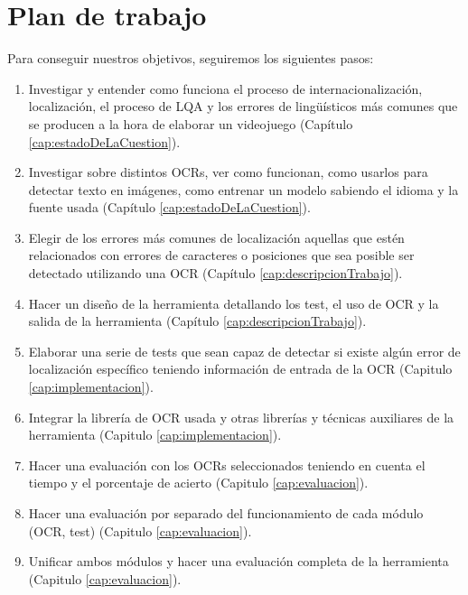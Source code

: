 \section{Plan de trabajo}
Para conseguir nuestros objetivos, seguiremos los siguientes pasos:
\begin{enumerate}
	\item Investigar y entender como funciona el proceso de internacionalización, localización, el proceso de LQA y los errores de lingüísticos más comunes que se producen a la hora de elaborar un videojuego (Capítulo \ref{cap:estadoDeLaCuestion}).
	\item Investigar sobre distintos OCRs, ver como funcionan, como usarlos para detectar texto en imágenes, como entrenar un modelo sabiendo el idioma y la fuente usada (Capítulo \ref{cap:estadoDeLaCuestion}).
	\item Elegir de los errores más comunes de localización aquellas que estén relacionados con errores de caracteres o posiciones que sea posible ser detectado utilizando una OCR (Capítulo \ref{cap:descripcionTrabajo}).
	\item Hacer un diseño de la herramienta detallando los test, el uso de OCR y la salida de la herramienta (Capítulo \ref{cap:descripcionTrabajo}).
	\item Elaborar una serie de tests que sean capaz de detectar si existe algún error de localización específico teniendo información de entrada de la OCR (Capitulo \ref{cap:implementacion}).
	\item Integrar la librería de OCR usada y otras librerías y técnicas auxiliares de la herramienta (Capitulo \ref{cap:implementacion}).
	\item Hacer una evaluación con los OCRs seleccionados teniendo en cuenta el tiempo y el porcentaje de acierto (Capitulo \ref{cap:evaluacion}).
	\item Hacer una evaluación por separado del funcionamiento de cada módulo (OCR, test) (Capitulo \ref{cap:evaluacion}).
	\item Unificar ambos módulos y hacer una evaluación completa de la herramienta (Capitulo \ref{cap:evaluacion}).
	
\end{enumerate}

